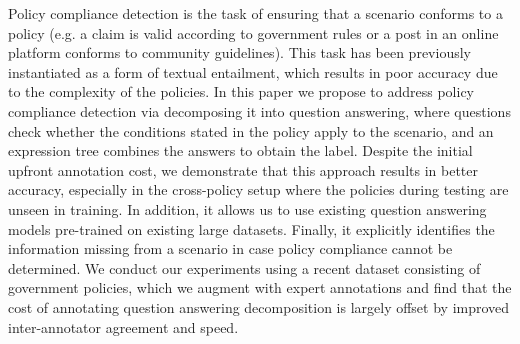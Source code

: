 Policy compliance detection is the task of ensuring that a scenario conforms to a policy (e.g. a claim is valid according to government rules or a post in an online platform conforms to community guidelines). This task has been previously instantiated as a form of textual entailment, which results in poor accuracy due to the complexity of the policies. In this paper we propose to address policy compliance detection via decomposing it into question answering, where questions check whether the conditions stated in the policy apply to the scenario, and an expression tree combines the answers to obtain the label. Despite the initial upfront annotation cost, we demonstrate that this approach results in better accuracy, especially in the cross-policy setup where the policies during testing are unseen in training. In addition, it allows us to use existing question answering models pre-trained on existing large datasets. Finally, it explicitly identifies the information missing from a scenario in case policy compliance cannot be determined. We conduct our experiments using a recent dataset consisting of government policies, which we augment with expert annotations and find that the cost of annotating question answering decomposition is largely offset by improved inter-annotator agreement and speed.
